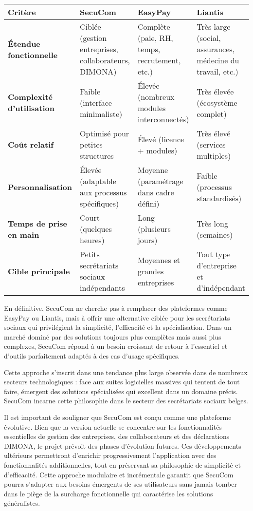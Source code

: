 \begin{center}
\begin{tabular}{|p{3cm}|p{3.5cm}|p{3.5cm}|p{3.5cm}|}
\hline
\textbf{Critère} & \textbf{SecuCom} & \textbf{EasyPay} & \textbf{Liantis} \\
\hline
\textbf{Étendue fonctionnelle} & Ciblée (gestion entreprises, collaborateurs, DIMONA) & Complète (paie, RH, temps, recrutement, etc.) & Très large (social, assurances, médecine du travail, etc.) \\
\hline
\textbf{Complexité d'utilisation} & Faible (interface minimaliste) & Élevée (nombreux modules interconnectés) & Très élevée (écosystème complet) \\
\hline
\textbf{Coût relatif} & Optimisé pour petites structures & Élevé (licence + modules) & Très élevé (services multiples) \\
\hline
\textbf{Personnalisation} & Élevée (adaptable aux processus spécifiques) & Moyenne (paramétrage dans cadre défini) & Faible (processus standardisés) \\
\hline
\textbf{Temps de prise en main} & Court (quelques heures) & Long (plusieurs jours) & Très long (semaines) \\
\hline
\textbf{Cible principale} & Petits secrétariats sociaux indépendants & Moyennes et grandes entreprises & Tout type d'entreprise et d'indépendant \\
\hline
\end{tabular}
\end{center}

En définitive, SecuCom ne cherche pas à remplacer des plateformes comme EasyPay ou Liantis, mais à offrir une alternative ciblée pour les secrétariats sociaux qui privilégient la simplicité, l'efficacité et la spécialisation. Dans un marché dominé par des solutions toujours plus complètes mais aussi plus complexes, SecuCom répond à un besoin croissant de retour à l'essentiel et d'outils parfaitement adaptés à des cas d'usage spécifiques.

Cette approche s'inscrit dans une tendance plus large observée dans de nombreux secteurs technologiques : face aux suites logicielles massives qui tentent de tout faire, émergent des solutions spécialisées qui excellent dans un domaine précis. SecuCom incarne cette philosophie dans le secteur des secrétariats sociaux belges.

Il est important de souligner que SecuCom est conçu comme une plateforme évolutive. Bien que la version actuelle se concentre sur les fonctionnalités essentielles de gestion des entreprises, des collaborateurs et des déclarations DIMONA, le projet prévoit des phases d'évolution futures. Ces développements ultérieurs permettront d'enrichir progressivement l'application avec des fonctionnalités additionnelles, tout en préservant sa philosophie de simplicité et d'efficacité. Cette approche modulaire et incrémentale garantit que SecuCom pourra s'adapter aux besoins émergents de ses utilisateurs sans jamais tomber dans le piège de la surcharge fonctionnelle qui caractérise les solutions généralistes.
